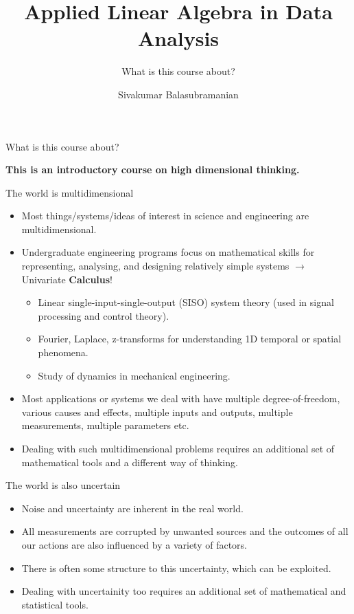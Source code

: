 \documentclass[aspectratio=169]{beamer}
\title{Applied Linear Algebra in Data Analysis}
\subtitle{What is this course about?}
\author{Sivakumar Balasubramanian}
\institute[Christian Medical College] %
{
  \inst{}%
  Department of Bioengineering\\
  Christian Medical College, Bagayam\\
  Vellore 632002
}
\date{}
\let\olditem\item
\renewcommand{\item}{\setlength{\itemsep}{\fill}\olditem}
\begin{document}
\begin{frame}
  \titlepage
\end{frame}


\begin{frame}[t]{What is this course about?}
  \vspace{2cm}
  \begin{center}
    \textcolor{myred}{\huge \textbf{This is an introductory course on high dimensional thinking.}}
  \end{center}
\end{frame}


\begin{frame}[t]{The world is multidimensional}
\begin{itemize}
  \item Most things/systems/ideas of interest in science and engineering are multidimensional.
  \item Undergraduate engineering programs focus on mathematical skills for representing, analysing, and designing relatively simple systems $\longrightarrow$ Univariate \textbf{Calculus}!
  \begin{itemize}
    \item Linear single-input-single-output (SISO) system theory (used in signal processing and control theory).
    \item Fourier, Laplace, z-transforms for understanding 1D temporal or spatial phenomena.
    \item Study of dynamics in mechanical engineering.
  \end{itemize}
  \item Most applications or systems we deal with have multiple degree-of-freedom, various causes and effects, multiple inputs and outputs, multiple measurements, multiple parameters etc.
  \item Dealing with such multidimensional problems requires an additional set of mathematical tools and a different way of thinking. 
\end{itemize}
\end{frame}


\begin{frame}{The world is also uncertain}
\begin{itemize}
  \item Noise and uncertainty are inherent in the real world.
  \item All measurements are corrupted by unwanted sources and the outcomes of all our actions are also influenced by a variety of factors.
  \item There is often some structure to this uncertainty, which can be exploited.
  \item Dealing with uncertainity too requires an additional set of mathematical and statistical tools.
\end{itemize}
\end{frame}
\end{document}

